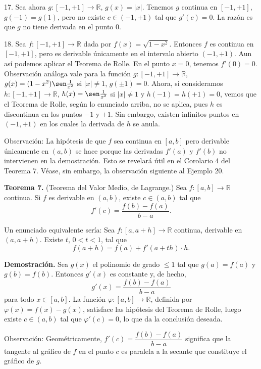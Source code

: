 \documentclass[12pt,oneside]{book}
\begin{document}
17. Sea ahora \( g: [-1, +1] \to \mathbb{R} \), \( g(x) = |x| \). Tenemos \( g \) continua en \( [-1, +1] \), \( g(-1) = g(1) \), pero no existe \( c \in (-1, +1) \) tal que \( g'(c) = 0 \). La razón es que \( g \) no tiene derivada en el punto \( 0 \).

18. Sea \( f: [-1, +1] \to \mathbb{R} \) dada por \( f(x) = \sqrt{1 - x^2} \). Entonces \( f \) es continua en \( [-1, +1] \), pero es derivable únicamente en el intervalo abierto \( (-1, +1) \). Aun así podemos aplicar el Teorema de Rolle. En el punto \( x = 0 \), tenemos \( f'(0) = 0 \). Observación análoga vale para la función \( g: [-1, +1] \to \mathbb{R} \), \( g(x) = (1 - x^2) \sen \frac{1}{x^2} \) si \( |x| \neq 1 \), \( g(\pm 1) = 0 \). Ahora, si consideramos \( h: [-1, +1] \to \mathbb{R} \), \( h(x) = \sen \frac{1}{x^2} \) si \( |x| \neq 1 \) y \( h(-1) = h(+1) = 0 \), vemos que el Teorema de Rolle, según lo enunciado arriba, no se aplica, pues \( h \) es discontinua en los puntos \( -1 \) y \( +1 \). Sin embargo, existen infinitos puntos en \( (-1, +1) \) en los cuales la derivada de \( h \) se anula.

Observación: La hipótesis de que \( f \) sea continua en \( [a, b] \) pero derivable únicamente en \( (a, b) \) se hace porque las derivadas \( f'(a) \) y \( f'(b) \) no intervienen en la demostración. Esto se revelará útil en el Corolario 4 del Teorema 7. Véase, sin embargo, la observación siguiente al Ejemplo 20.

\textbf{Teorema 7.} (Teorema del Valor Medio, de Lagrange.) Sea \( f: [a, b] \to \mathbb{R} \) continua. Si \( f \) es derivable en \( (a, b) \), existe \( c \in (a, b) \) tal que
\[
f'(c) = \frac{f(b) - f(a)}{b - a}.
\]

Un enunciado equivalente sería: Sea \( f: [a, a+h] \to \mathbb{R} \) continua, derivable en \( (a, a+h) \). Existe \( t \), \( 0 < t < 1 \), tal que
\[
f(a + h) = f(a) + f'(a + th) \cdot h.
\]

\textbf{Demostración.} Sea \( g(x) \) el polinomio de grado \( \leq 1 \) tal que \( g(a) = f(a) \) y \( g(b) = f(b) \). Entonces \( g'(x) \) es constante y, de hecho,
\[
g'(x) = \frac{f(b) - f(a)}{b - a}
\]
para todo \( x \in [a, b] \). La función \( \varphi: [a, b] \to \mathbb{R} \), definida por \( \varphi(x) = f(x) - g(x) \), satisface las hipótesis del Teorema de Rolle, luego existe \( c \in (a, b) \) tal que \( \varphi'(c) = 0 \), lo que da la conclusión deseada.

Observación: Geométricamente, \( f'(c) = \dfrac{f(b) - f(a)}{b - a} \) significa que la tangente al gráfico de \( f \) en el punto \( c \) es paralela a la secante que constituye el gráfico de \( g \).
\end{document}
